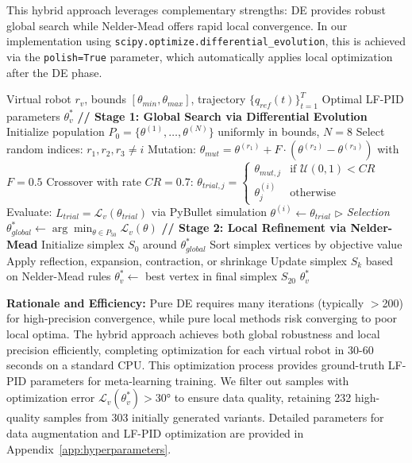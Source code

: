 \documentclass[a4paper]{cas-sc}
\begin{document}
This hybrid approach leverages complementary strengths: DE provides robust global search while Nelder-Mead offers rapid local convergence. In our implementation using \texttt{scipy.optimize.differential\_evolution}, this is achieved via the \texttt{polish=True} parameter, which automatically applies local optimization after the DE phase.

\begin{algorithm}[h]
\caption{Hybrid LF-PID Optimization for Virtual Robots}
\label{alg:hybrid_optimization}
\begin{algorithmic}[1]
\REQUIRE Virtual robot $r_v$, bounds $[\theta_{min}, \theta_{max}]$, trajectory $\{q_{ref}(t)\}_{t=1}^T$
\ENSURE Optimal LF-PID parameters $\theta^*_v$
\STATE \textbf{// Stage 1: Global Search via Differential Evolution}
\STATE Initialize population $P_0 = \{\theta^{(1)}, \ldots, \theta^{(N)}\}$ uniformly in bounds, $N=8$
        \STATE Select random indices: $r_1, r_2, r_3 \neq i$
        \STATE Mutation: 
        \STATE \quad $\theta_{mut} = \theta^{(r_1)} + F \cdot (\theta^{(r_2)} - \theta^{(r_3)})$ \quad with $F=0.5$
        \STATE Crossover with rate $CR=0.7$:
        \STATE \quad $\theta_{trial,j} = \begin{cases} 
        \theta_{mut,j} & \text{if } \mathcal{U}(0,1) < CR \\
        \theta^{(i)}_j & \text{otherwise}
        \end{cases}$
        \STATE Evaluate: $L_{trial} = \mathcal{L}_v(\theta_{trial})$ via PyBullet simulation
            \STATE $\theta^{(i)} \gets \theta_{trial}$ \hfill $\triangleright$ \textit{Selection}
        \ENDIF
    \ENDFOR
\ENDFOR
\STATE $\theta^*_{global} \gets \arg\min_{\theta \in P_{50}} \mathcal{L}_v(\theta)$
\STATE 
\STATE \textbf{// Stage 2: Local Refinement via Nelder-Mead}
\STATE Initialize simplex $S_0$ around $\theta^*_{global}$
    \STATE Sort simplex vertices by objective value
    \STATE Apply reflection, expansion, contraction, or shrinkage
    \STATE Update simplex $S_k$ based on Nelder-Mead rules
\ENDFOR
\STATE $\theta^*_v \gets$ best vertex in final simplex $S_{20}$
\RETURN $\theta^*_v$
\end{algorithmic}
\end{algorithm}

    \textbf{Rationale and Efficiency:} Pure DE requires many iterations (typically $>$200) for high-precision convergence, while pure local methods risk converging to poor local optima. The hybrid approach achieves both global robustness and local precision efficiently, completing optimization for each virtual robot in 30-60 seconds on a standard CPU. This optimization process provides ground-truth LF-PID parameters for meta-learning training. We filter out samples with optimization error $\mathcal{L}_v(\theta^*_v) > 30°$ to ensure data quality, retaining 232 high-quality samples from 303 initially generated variants. Detailed parameters for data augmentation and LF-PID optimization are provided in Appendix~\ref{app:hyperparameters}.
\end{document}
